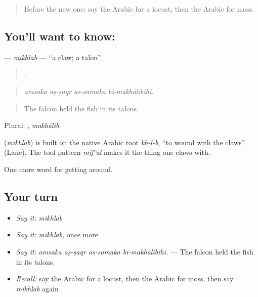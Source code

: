 \label{lesson:AR-C476-mikhlab}



\begin{quote}
Before the new one: say the Arabic for a locust, then the Arabic for moss.
\end{quote}

\subsection*{You'll want to know: }
\textbf{} — \emph{mikhlab} — \textquotedblleft{}a claw; a talon\textquotedblright{}.

\begin{quote}
   .
\end{quote}

\begin{quote}
\emph{amsaka aṣ-ṣaqr as-samaka bi-makhālibihi.}
\end{quote}

\begin{quote}
The falcon held the fish in its talons.
\end{quote}

Plural: , \emph{makhālib}.

\begin{cousinweb}
\textbf{} (\emph{mikhlab}) is built on the native Arabic root \emph{kh-l-b}, \textquotedblleft{}to wound with the claws\textquotedblright{} (Lane). The tool pattern \emph{mifʿal} makes it the thing one claws with.
\end{cousinweb}

\begin{grammarlens}[title={What you've built}]
One more word for getting around.
\end{grammarlens}

\subsection*{Your turn}
\begin{itemize}
\raggedright
  \item \emph{Say it:} \emph{mikhlab}
  \item \emph{Say it:} \emph{mikhlab}, once more
  \item \emph{Say it:} \emph{amsaka aṣ-ṣaqr as-samaka bi-makhālibihi.} — The falcon held the fish in its talons.
  \item \emph{Recall:} say the Arabic for a locust, then the Arabic for moss, then say \emph{mikhlab} again
\end{itemize}

